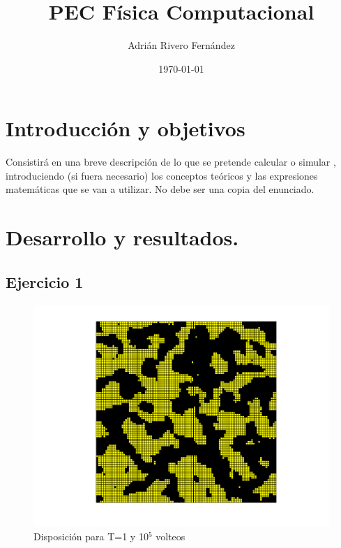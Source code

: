 \documentclass[a4paper,12pt,spanish]{article}
\begin{document}
	
	
	\title{PEC Física Computacional}
	
	\author{Adrián Rivero Fernández}
	\date{\today}
	
	\maketitle
	
	
	\section{Introducción y objetivos}

	Consistirá en una breve
descripción de lo que se pretende calcular o simular , introduciendo (si fuera necesario) los
conceptos teóricos y las expresiones matemáticas que se van a utilizar. No debe ser una
copia del enunciado.



	\section{Desarrollo y resultados.}
	
	\subsection{Ejercicio 1}
	
	
	
	\begin{figure}[H]
		\centering
		\includegraphics[width=0.7\linewidth]{../obtencion_resultados/a}
		\caption{Disposición para T=1 y 10$^5$ volteos}
		\label{fig:a}
	\end{figure}
\end{document}

